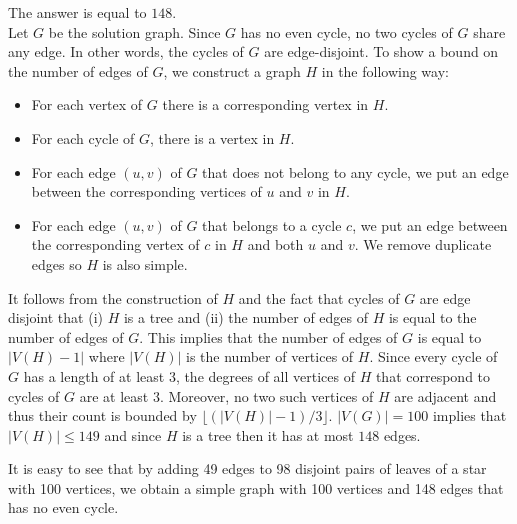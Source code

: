 \begin{solution}
	The answer is equal to $148$.\\[0.2cm]
	
	Let $G$ be the solution graph. Since $G$ has no even cycle, no two cycles of $G$  share any edge. In other words, the cycles of $G$ are edge-disjoint. To show a bound on the number of edges of $G$, we construct a graph $H$ in the following way:
	\begin{itemize}
		\item For each vertex of $G$ there is a corresponding vertex in $H$.
		\item For each cycle of $G$, there is a vertex in $H$.
		\item For each edge $(u,v)$ of $G$ that does not belong to any cycle, we put an edge between the corresponding vertices of $u$ and $v$ in $H$.
		\item For each edge $(u,v)$ of $G$ that belongs to a cycle $c$, we put an edge between the corresponding vertex of $c$ in $H$ and both $u$ and $v$. We remove duplicate edges so $H$ is also simple.
	\end{itemize}

It follows from the construction of $H$ and the fact that cycles of $G$ are edge disjoint that (i) $H$ is a tree and (ii) the number of edges of $H$ is equal to the number of edges of $G$. This implies that the number of edges of $G$ is equal to $|V(H)-1|$ where $|V(H)|$ is the number of vertices of $H$. Since every cycle of $G$ has a length of at least $3$, the degrees of all vertices of $H$ that correspond to cycles of $G$ are at least $3$. Moreover, no two such vertices of $H$ are adjacent and thus their count is bounded by $\lfloor (|V(H)|-1)/3 \rfloor$. $|V(G)| =100$ implies that $|V(H)| \leq 149$ and since $H$ is a tree then it has at most $148$ edges. 

It is easy to see that by adding 49 edges to 98 disjoint pairs of leaves of a star with 100 vertices, we obtain a simple graph with 100 vertices and 148 edges that has no even cycle.
\end{solution}
